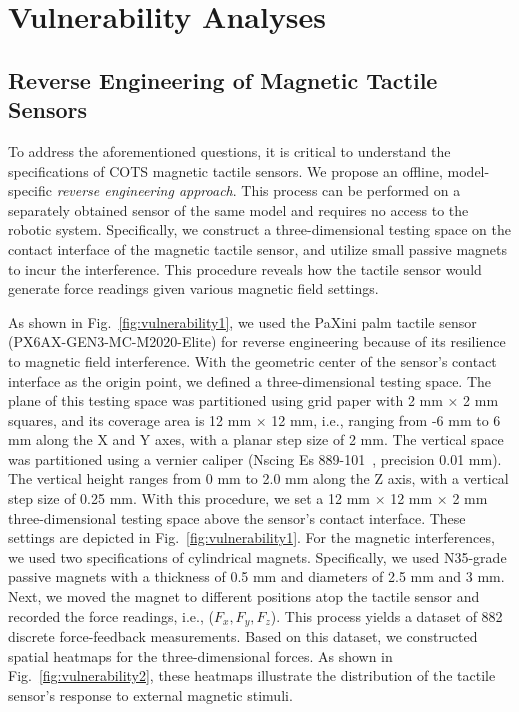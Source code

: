 \section{Vulnerability Analyses}
\label{sec:vulnerability}
\subsection{Reverse Engineering of Magnetic Tactile Sensors}
\label{sec:reverse engineering}
To address the aforementioned questions, it is critical to understand the specifications of COTS magnetic tactile sensors. 
We propose an offline, model-specific \emph{reverse engineering approach}. This process can be performed on a separately obtained sensor of the same model and requires no access to the robotic system.
Specifically, we construct a three-dimensional testing space on the contact interface of the magnetic tactile sensor, and utilize small passive magnets to incur the interference.
This procedure reveals how the tactile sensor would generate force readings given various magnetic field settings.

As shown in Fig.~\ref{fig:vulnerability1}, we used the PaXini palm tactile sensor (PX6AX-GEN3-MC-M2020-Elite) for reverse engineering because of its resilience to magnetic field interference.
With the geometric center of the sensor's contact interface as the origin point, we defined a three-dimensional testing space.
The plane of this testing space was partitioned using grid paper with 2 mm × 2 mm squares, and its coverage area is 12 mm × 12 mm, i.e., ranging from -6 mm to 6 mm along the X and Y axes, with a planar step size of 2 mm.
The vertical space was partitioned using a vernier caliper (Nscing Es 889-101~\cite{ebuy7_nscing_889101}, precision 0.01 mm).
The vertical height ranges from 0 mm to 2.0 mm along the Z axis, with a vertical step size of 0.25 mm.
With this procedure, we set a 12 mm × 12 mm × 2 mm three-dimensional testing space above the sensor's contact interface.
These settings are depicted in Fig.~\ref{fig:vulnerability1}.
For the magnetic interferences, we used two specifications of cylindrical magnets.
Specifically, we used N35-grade passive magnets with a thickness of 0.5 mm and diameters of 2.5 mm and 3 mm.
Next, we moved the magnet to different positions atop the tactile sensor and recorded the force readings, i.e., ($F_x, F_y, F_z$).
This process yields a dataset of 882 discrete force-feedback measurements.
Based on this dataset, we constructed spatial heatmaps for the three-dimensional forces. 
As shown in Fig.~\ref{fig:vulnerability2}, these heatmaps illustrate the distribution of the tactile sensor's response to external magnetic stimuli. 

